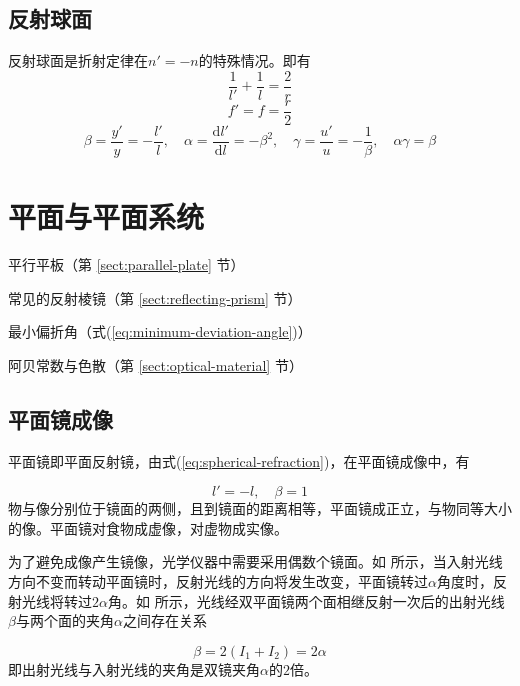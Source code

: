 \documentclass[cn,10pt,chinesefont=founder,math=newtx,cite=super,twoside]{elegantbook}
\begin{document}
\section{反射球面}
反射球面是折射定律在$n'=-n$的特殊情况。即有
\begin{equation}
\frac{1}{l'}+\frac{1}{l}=\frac{2}{r}
\end{equation}
\begin{equation}
f'=f=\frac{r}{2}
\end{equation}
\begin{equation}
\beta=\frac{y'}{y}=-\frac{l'}{l},\quad
\alpha=\frac{\mathrm{d}l'}{\mathrm{d}l}=-\beta^2,\quad
\gamma=\frac{u'}{u}=-\frac{1}{\beta},\quad
\alpha\gamma=\beta
\end{equation}

\chapter{平面与平面系统}

\begin{introduction}
	\item 平行平板（第 \ref{sect:parallel-plate} 节）
	\item 常见的反射棱镜（第 \ref{sect:reflecting-prism} 节）
	\item 最小偏折角（式(\ref{eq:minimum-deviation-angle})）
	\item 阿贝常数与色散（第 \ref{sect:optical-material} 节）
\end{introduction}

\section{平面镜成像}
平面镜即平面反射镜，由式(\ref{eq:spherical-refraction})，在平面镜成像中，有

\begin{equation}
l'=-l,\quad\beta=1
\end{equation}
物与像分别位于镜面的两侧，且到镜面的距离相等，平面镜成正立，与物同等大小的像。平面镜对食物成虚像，对虚物成实像。

为了避免成像产生镜像，光学仪器中需要采用偶数个镜面。如 所示，当入射光线方向不变而转动平面镜时，反射光线的方向将发生改变，平面镜转过$\alpha$角度时，反射光线将转过$2\alpha$角。如 所示，光线经双平面镜两个面相继反射一次后的出射光线$\beta$与两个面的夹角$\alpha$之间存在关系

\begin{equation}
\beta=2(I_1+I_2)=2\alpha
\end{equation}
即出射光线与入射光线的夹角是双镜夹角$\alpha$的$2$倍。
\end{document}
